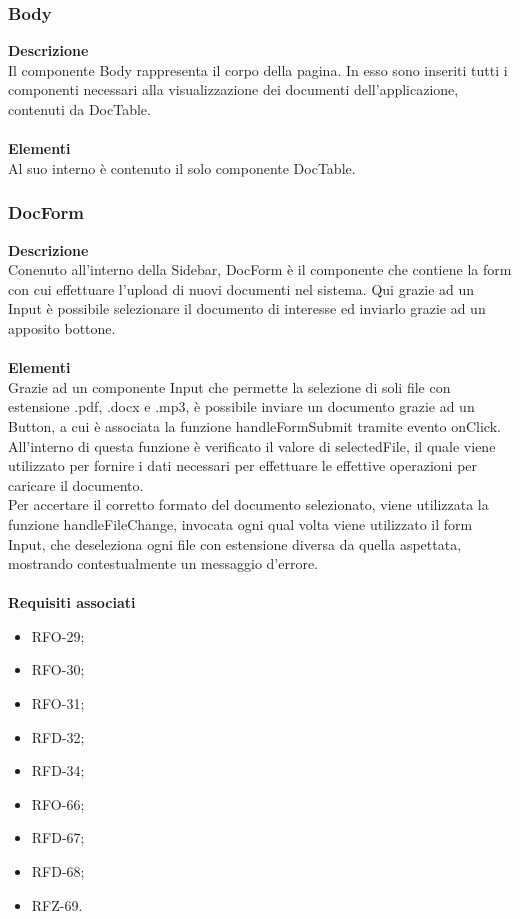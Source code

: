\subsubsection{Body}

\textbf{Descrizione}\\
Il componente Body rappresenta il corpo della pagina. In esso sono inseriti tutti i componenti necessari alla visualizzazione dei documenti dell'applicazione, contenuti da DocTable.\\ \\
\textbf{Elementi}\\
Al suo interno è contenuto il solo componente DocTable.

\subsubsection{DocForm}

\textbf{Descrizione}\\
Conenuto all'interno della Sidebar, DocForm è il componente che contiene la form con cui effettuare l'upload di nuovi documenti nel sistema. Qui grazie ad un Input è possibile selezionare il documento di interesse ed inviarlo grazie ad un apposito bottone.\\ \\
\textbf{Elementi}\\
Grazie ad un componente Input che permette la selezione di soli file con estensione .pdf, .docx e .mp3, è possibile inviare un documento grazie ad un Button, a cui è associata la funzione handleFormSubmit tramite evento onClick. All'interno di questa funzione è verificato il valore di selectedFile, il quale viene utilizzato per fornire i dati necessari per effettuare le effettive operazioni per caricare il documento.\\
Per accertare il corretto formato del documento selezionato, viene utilizzata la funzione handleFileChange, invocata ogni qual volta viene utilizzato il form Input, che deseleziona ogni file con estensione diversa da quella aspettata, mostrando contestualmente un messaggio d'errore.\\ \\
\textbf{Requisiti associati}
\begin{itemize}[itemsep=-4pt]
    \item RFO-29;
    \item RFO-30;
    \item RFO-31;
    \item RFD-32;
    \item RFD-34;
    \item RFO-66;
    \item RFD-67;
    \item RFD-68;
    \item RFZ-69.
\end{itemize}

